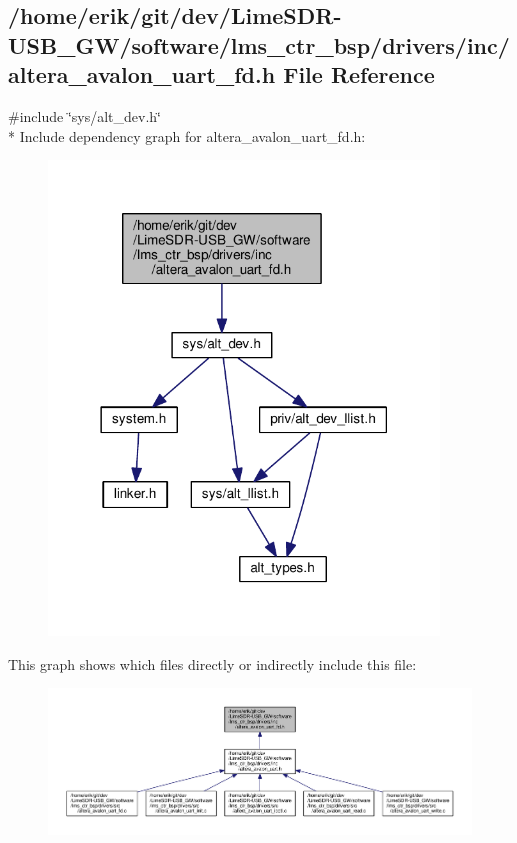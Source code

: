 \subsection{/home/erik/git/dev/\+Lime\+S\+D\+R-\/\+U\+S\+B\+\_\+\+G\+W/software/lms\+\_\+ctr\+\_\+bsp/drivers/inc/altera\+\_\+avalon\+\_\+uart\+\_\+fd.h File Reference}
\label{altera__avalon__uart__fd_8h}
{\ttfamily \#include \char`\"{}sys/alt\+\_\+dev.\+h\char`\"{}}\\*
Include dependency graph for altera\+\_\+avalon\+\_\+uart\+\_\+fd.\+h\+:
\nopagebreak
\begin{figure}[H]
\begin{center}
\leavevmode
\includegraphics[width=294pt]{d5/dc7/altera__avalon__uart__fd_8h__incl}
\end{center}
\end{figure}
This graph shows which files directly or indirectly include this file\+:
\nopagebreak
\begin{figure}[H]
\begin{center}
\leavevmode
\includegraphics[width=350pt]{d9/d16/altera__avalon__uart__fd_8h__dep__incl}
\end{center}
\end{figure}
